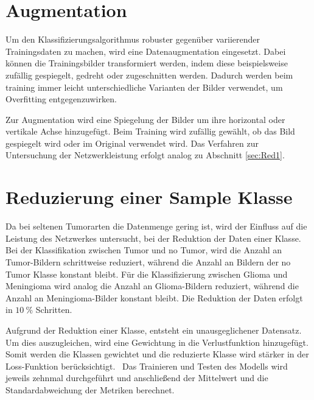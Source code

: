 \section{Augmentation}
Um den Klassifizierungsalgorithmus robuster gegenüber variierender Trainingsdaten zu machen, wird eine Datenaugmentation eingesetzt.
Dabei können die Trainingsbilder transformiert werden, indem diese beispielsweise zufällig gespiegelt, gedreht oder zugeschnitten werden. 
Dadurch werden beim training immer leicht unterschiedliche Varianten der Bilder verwendet, um Overfitting entgegenzuwirken.~\cite{Yamashita2018}

Zur Augmentation wird eine Spiegelung der Bilder um ihre horizontal oder vertikale Achse hinzugefügt.
Beim Training wird zufällig gewählt, ob das Bild gespiegelt wird oder im Original verwendet wird.
Das Verfahren zur Untersuchung der Netzwerkleistung erfolgt analog zu Abschnitt \ref{sec:Red1}.    

\section{Reduzierung einer Sample Klasse}
Da bei seltenen Tumorarten die Datenmenge gering ist, wird der Einfluss auf die Leistung des Netzwerkes untersucht, 
bei der Reduktion der Daten einer Klasse.
Bei der Klassifikation zwischen Tumor und no Tumor, wird die Anzahl an Tumor-Bildern schrittweise reduziert, 
während die Anzahl an Bildern der no Tumor Klasse konstant bleibt.
Für die Klassifizierung zwischen Glioma und Meningioma wird analog die Anzahl an Glioma-Bildern reduziert, während die Anzahl an Meningioma-Bilder konstant bleibt.
Die Reduktion der Daten erfolgt in $\qty{10}{\%}$ Schritten. 

Aufgrund der Reduktion einer Klasse, entsteht ein unausgeglichener Datensatz.
Um dies auszugleichen, wird eine Gewichtung in die Verlustfunktion hinzugefügt.
Somit werden die Klassen gewichtet und die reduzierte Klasse wird stärker in der Loss-Funktion berücksichtigt.~\cite{pytorchCrossEntropy}
Das Trainieren und Testen des Modells wird jeweils zehnmal durchgeführt und anschließend der Mittelwert und die Standardabweichung der
Metriken berechnet.


